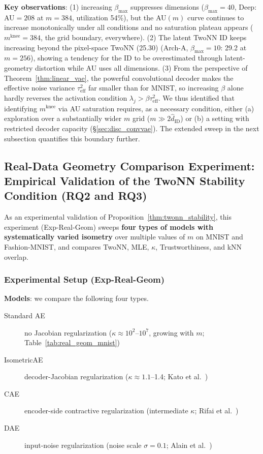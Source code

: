 \documentclass[make,article,submit,pdftex,moreauthors]{Definitions/mdpi}
\newcommand{\kap}{\kappa}
\newcommand{\mknee}{m^{\mathrm{knee}}}
\begin{document}
\textbf{Key observations}:
(1) increasing $\beta_{\max}$ suppresses dimensions
($\beta_{\max}=40$, Deep: AU$=208$ at $m=384$, utilization 54\%), but the
AU$(m)$ curve continues to increase monotonically under all conditions and no
saturation plateau appears ($\mknee=384$, the grid boundary, everywhere).
(2) The latent TwoNN ID keeps increasing beyond the pixel-space TwoNN (25.30)
(Arch-A, $\beta_{\max}=10$: 29.2 at $m=256$), showing a tendency for the ID
to be overestimated through latent-geometry distortion while AU uses all
dimensions.
(3) From the perspective of Theorem~\ref{thm:linear_vae}, the powerful
convolutional decoder makes the effective noise variance
$\tau^2_\mathrm{eff}$ far smaller than for MNIST, so increasing $\beta$
alone hardly reverses the activation condition
$\lambda_j > \beta\tau^2_\mathrm{eff}$.
We thus identified that identifying $\mknee$ via AU saturation requires, as a
necessary condition, either (a) exploration over a substantially wider $m$
grid ($m \gg 2\hat{d}_\mathrm{ID}$) or (b) a setting with restricted decoder
capacity (\S\ref{sec:disc_convvae}).
The extended sweep in the next subsection quantifies this boundary further.

\subsection{Real-Data Geometry Comparison Experiment: Empirical Validation of the TwoNN Stability Condition (RQ2 and RQ3)}\label{sec:exp_real_geom}

As an experimental validation of Proposition~\ref{thm:twonn_stability},
this experiment (Exp-Real-Geom) sweeps \textbf{four types of models with
systematically varied isometry} over multiple values of $m$ on MNIST and
Fashion-MNIST, and compares TwoNN, MLE, $\kap$, Trustworthiness, and kNN
overlap.

\subsubsection*{Experimental Setup (Exp-Real-Geom)}

\textbf{Models}: we compare the following four types.
\begin{description}
  \item[Standard AE] no Jacobian regularization ($\kap \approx 10^2$--$10^7$, growing with $m$; Table~\ref{tab:real_geom_mnist})
  \item[IsometricAE] decoder-Jacobian regularization ($\kap \approx 1.1$--1.4; Kato et al.~\cite{kato2020rdae})
  \item[CAE] encoder-side contractive regularization (intermediate $\kap$; Rifai et al.~\cite{rifai2011cae})
  \item[DAE] input-noise regularization (noise scale $\sigma=0.1$; Alain et al.~\cite{alain2014dae})
\end{description}
\end{document}
